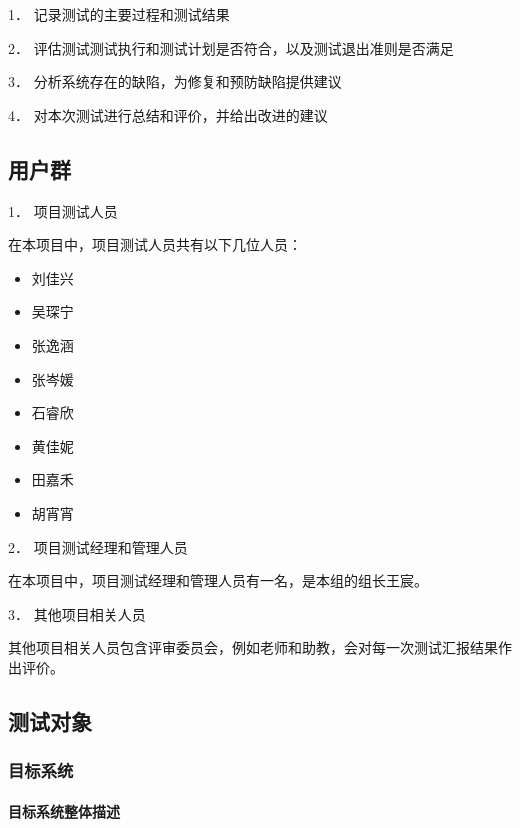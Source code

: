 \documentclass[hyperref, a4paper]{ctexart}
\let\oldparagraph\paragraph
\renewcommand{\paragraph}[1]{\oldparagraph{#1}\mbox{}}
\begin{document}
1． 记录测试的主要过程和测试结果

2． 评估测试测试执行和测试计划是否符合，以及测试退出准则是否满足

3． 分析系统存在的缺陷，为修复和预防缺陷提供建议

4． 对本次测试进行总结和评价，并给出改进的建议

\hypertarget{ux7528ux6237ux7fa4}{%
\subsection{用户群}\label{ux7528ux6237ux7fa4}}

1． 项目测试人员

在本项目中，项目测试人员共有以下几位人员：

\begin{itemize}
\item
  刘佳兴
\item
  吴琛宁
\item
  张逸涵
\item
  张岑媛
\item
  石睿欣
\item
  黄佳妮
\item
  田嘉禾
\item
  胡宵宵
\end{itemize}

2． 项目测试经理和管理人员

在本项目中，项目测试经理和管理人员有一名，是本组的组长王宸。

3． 其他项目相关人员

其他项目相关人员包含评审委员会，例如老师和助教，会对每一次测试汇报结果作出评价。

\hypertarget{ux6d4bux8bd5ux5bf9ux8c61}{%
\subsection{测试对象}\label{ux6d4bux8bd5ux5bf9ux8c61}}

\hypertarget{ux76eeux6807ux7cfbux7edf}{%
\subsubsection{目标系统}\label{ux76eeux6807ux7cfbux7edf}}

\hypertarget{ux76eeux6807ux7cfbux7edfux6574ux4f53ux63cfux8ff0}{%
\paragraph{目标系统整体描述}\label{ux76eeux6807ux7cfbux7edfux6574ux4f53ux63cfux8ff0}}
\end{document}
